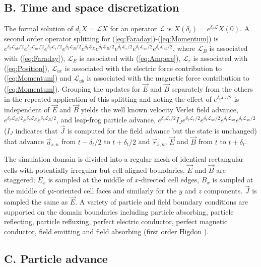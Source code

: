 \documentclass[letter,10pt]{article}
\newcommand{\vecr}{\vec{r}}
\newcommand{\vecu}{\vec{u}}
\newcommand{\vecJ}{\vec{J}}
\newcommand{\vecE}{\vec{E}}
\newcommand{\vecB}{\vec{B}}
\newcommand{\op}{\mathcal{L}}
\newcommand{\Deriv}[2]{d_{#2}#1}
\newcommand{\eq}[1]{(\ref{eq:#1})}
\begin{document}
\subsection{B. Time and space discretization}

The formal solution of $\Deriv{X}{t} = \op X$ for an operator $\op$ is
$X\left(\delta_t\right) = e^{\delta_t\op} X\left(0\right)$.  A second
order operator splitting \cite{McLachlan_Quispel_2002} for
\eq{Faraday}-\eq{Momentum} is
$e^{\delta_t\op_{ub}/2} e^{\delta_t\op_{ue}/2} e^{\delta_t\op_r/2}
e^{\delta_t\op_B/2}e^{\delta_t\op_E} e^{\delta_t\op_B/2}
e^{\delta_t\op_r/2} e^{\delta_t\op_{ue}/2} e^{\delta_t\op_{ub}/2}$,
where $\op_B$ is associated with \eq{Faraday}, $\op_E$ is associated
with \eq{Ampere}, $\op_r$ is associated with \eq{Position}, $\op_{ue}$
is associated with the electric force contribution to \eq{Momentum}
and $\op_{ub}$ is associated with the magnetic force contribution to
\eq{Momentum}.  Grouping the updates for $\vecE$ and $\vecB$ separately
from the others in the repeated application of this splitting and
noting the effect of $e^{\delta_t\op_r/2}$ is independent of $\vecE$
and $\vecB$ yields the well known velocity Verlet field advance,
$e^{\delta_t\op_B/2} e^{\delta_t\op_E} e^{\delta_t\op_B/2}$, and
leap-frog particle advance, $e^{\delta_t\op_r/2} I_J
e^{\delta_t\op_r/2} e^{\delta_t\op_{ue}/2} e^{\delta_t\op_{ub}}
e^{\delta_t\op_{ue}/2}$ ($I_J$ indicates that $\vecJ$ is computed for
the field advance but the state is unchanged) that advance
$\vecu_{s,n}$ from $t-\delta_t/2$ to $t+\delta_t/2$ and $\vecr_{s,n}$,
$\vecE$ and $\vecB$ from $t$ to $t+\delta_t$.

The simulation domain is divided into a regular mesh of identical
rectangular cells with potentially irregular but cell aligned
boundaries.  $\vecE$ and $\vecB$ are staggered; $E_x$ is sampled at
the middle of $x$-directed cell edges, $B_x$ is sampled at the middle
of $yz$-oriented cell faces and similarly for the $y$ and $z$
components.  $\vecJ$ is sampled the same as $\vecE$.  A variety of
particle and field boundary conditions are supported on the domain
boundaries including particle absorbing, particle reflecting, particle
refluxing, perfect electric conductor, perfect magnetic conductor,
field emitting and field absorbing (first order Higdon
\cite{Higdon_1986}).

\subsection{C. Particle advance}
\end{document}
